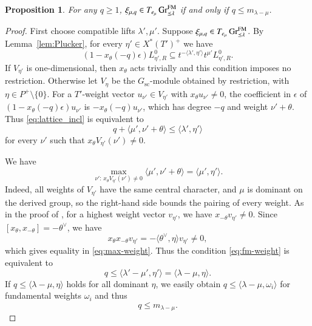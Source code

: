 \documentclass[a4paper, 12pt]{amsart}
\newtheorem{proposition}[theorem]{Proposition}
\theoremstyle{definition}
\DeclareMathOperator{\Gr}{\mathrm{Gr}}
\begin{document}
\begin{proposition}\label{prop:fmtest}
For any $q\geq1$,
$\xi_{\mu,q}\in T_{e_\mu}\Gr^{\rm FM}_{\preceq\lambda}$ if and only if
$q\leq m_{\lambda-\mu}$.
\end{proposition}

\begin{proof}
First choose compatible lifts
$\lambda',\mu'$. Suppose
$\xi_{\mu,q}\in T_{e_\mu}\Gr^{\rm FM}_{\preceq\lambda}$.
By Lemma~\ref{lem:Plucker}, for every $\eta'\in X^*(T')^+$ we have
\begin{equation}\label{eq:lattice_incl}
(1-x_\theta(-q)\epsilon)L^0_{\eta',R}
\subseteq t^{-\langle\lambda',\eta'\rangle}t^{\mu'}L^0_{\eta',R}.
\end{equation}
If $V_{\eta'}$ is one-dimensional, then $x_\theta$ acts trivially and this
condition imposes no restriction. Otherwise let $V_\eta$ be the
$G_{\mathrm{sc}}$-module obtained by restriction, with $\eta\in P^+\setminus\{0\}$.
For a $T'$-weight vector $u_{\nu'}\in V_{\eta'}$ with
$x_\theta u_{\nu'}\neq0$, the coefficient in $\epsilon$ of
$(1-x_\theta(-q)\epsilon)u_{\nu'}$ is $-x_\theta(-q)u_{\nu'}$, which has
degree $-q$ and weight $\nu'+\theta$. Thus \eqref{eq:lattice_incl} is
equivalent to
\begin{equation}\label{eq:fm-weight}
q+\langle\mu',\nu'+\theta\rangle
\leq\langle\lambda',\eta'\rangle
\end{equation}
for every $\nu'$ such that $x_\theta V_{\eta'}(\nu')\neq0$.

We have
\begin{equation}\label{eq:max-weight}
\max_{\nu':\,x_\theta V_{\eta'}(\nu')\neq0}
\langle\mu',\nu'+\theta\rangle
=\langle\mu',\eta'\rangle.
\end{equation}
Indeed, all weights of $V_{\eta'}$ have the same central character, and
$\mu$ is dominant on the derived group, so the right-hand side bounds the
pairing of every weight. As in the proof of \cite[Theorem~4.5]{BHY}, for a highest weight vector $v_{\eta'}$, we have
$x_{-\theta}v_{\eta'}\neq 0$. Since
$[x_\theta,x_{-\theta}]=-\theta^\vee$, we have
\[
x_\theta x_{-\theta}v_{\eta'}
=-\langle\theta^\vee,\eta\rangle v_{\eta'}\neq0,
\]
which gives equality in \eqref{eq:max-weight}. Thus the condition \eqref{eq:fm-weight} is equivalent to
\begin{equation}\label{eq:fm-eta}
q\leq\langle\lambda'-\mu',\eta'\rangle
=\langle\lambda-\mu,\eta\rangle.
\end{equation}
If $q \leq \langle \lambda-\mu, \eta \rangle$ holds for all dominant $\eta$, we easily obtain $q \leq \langle \lambda-\mu, \omega_i \rangle$ for fundamental weights $\omega_i$ and thus 
\[q \leq m_{\lambda-\mu}. \] 


\end{proof}
\end{document}
